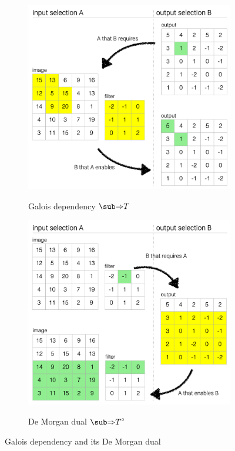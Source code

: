 \begin{figure}
   \begin{subfigure}{0.53\textwidth}
      {\includegraphics[scale=0.38]{fig/example/4-relations-1.png}}
      \vspace{2mm}
      \caption{Galois dependency $\evalGC{T}$}
      \label{fig:example:convolve-viz:galois-dependency}
   \end{subfigure}
   \begin{subfigure}{0.46\textwidth}
      {\includegraphics[scale=0.38]{fig/example/4-relations-2.png}}
      \vspace{2mm}
      \caption{De Morgan dual $\dual{\evalGC{T}}$}
      \label{fig:example:convolve-viz:de-morgan-dual}
   \end{subfigure}
   \caption{Galois dependency and its De Morgan dual}
   \label{fig:example:convolve-viz}
\end{figure}
